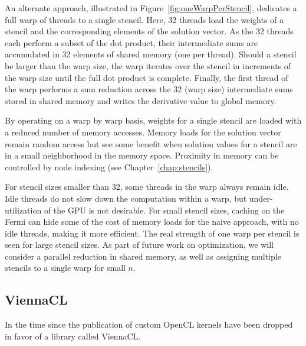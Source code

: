 \documentclass{report}
\begin{document}
An alternate approach, illustrated in Figure~\ref{fig:oneWarpPerStencil}, dedicates a full warp of threads to a single stencil. Here, 32 threads load the weights of a stencil and the corresponding elements of the solution vector. As the 32 threads each perform a subset of the dot product, their intermediate sums are accumulated in 32 elements of shared memory (one per thread).
Should  a stencil be larger than the warp size, the warp iterates over the stencil in increments of the warp size until the full dot product is complete. Finally, the first thread of the warp performs a sum reduction across the 32 (warp size)  intermediate sums stored in shared memory and writes the derivative value to global memory. 

By operating on a warp by warp basis, weights for a single stencil are loaded with a reduced number of memory accesses. Memory loads for the solution vector remain random access but see some benefit when solution values for a stencil are in a small neighborhood in the memory space. Proximity in memory can be controlled by node indexing (see Chapter~\ref{chap:stencils}). 

For stencil sizes smaller than 32, some threads in the warp always remain idle. Idle threads do not slow down the computation within a warp, but under-utilization of the GPU is not desirable. For small stencil sizes, caching on the Fermi can hide some of the cost of memory loads for the naive approach, with no idle threads, making it more efficient. The real strength of one warp per stencil is seen for large stencil sizes. 
As part of future work on optimization, we will consider a parallel reduction in shared memory, as well as assigning multiple stencils to a single warp for small  $n$. 





\subsection{ViennaCL} 

In the time since the publication of \cite{BolligFlyerErlebacher2012} custom OpenCL kernels have been dropped in favor of a library called ViennaCL. 
\end{document}
